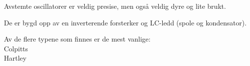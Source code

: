 Avstemte oscillatorer er veldig presise, men også veldig dyre og lite brukt.

De er bygd opp av en inverterende forsterker og LC-ledd (spole og kondensator).

Av de flere typene som finnes er de mest vanlige: \\
Colpitts \\
Hartley
